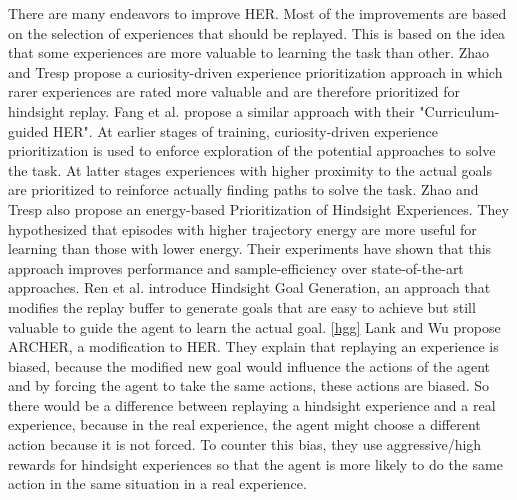\vspace{0.5cm}

There are many endeavors to improve HER. 
Most of the improvements are based on the selection of experiences that should be replayed. This is based on the idea that some experiences are more valuable to learning the task than other.
\newline
Zhao and Tresp propose a curiosity-driven experience prioritization approach in which rarer experiences are rated more valuable and are therefore prioritized for hindsight replay. \cite{curiousher}
\newline
Fang et al. propose a similar approach with their "Curriculum-guided HER". At earlier stages of training, curiosity-driven experience prioritization is used to enforce exploration of the potential approaches to solve the task. At latter stages experiences with higher proximity to the actual goals are prioritized to reinforce actually finding paths to solve the task. \cite{curricher}
\newline
Zhao and Tresp also propose an energy-based Prioritization of Hindsight Experiences. They hypothesized that episodes with higher trajectory energy are more useful for learning than those with lower energy. Their experiments have shown that this approach improves performance and sample-efficiency over state-of-the-art approaches. \cite{energyher}
\newline
Ren et al. introduce Hindsight Goal Generation, an approach that modifies the replay buffer to generate goals that are easy to achieve but still valuable to guide the agent to learn the actual goal. \ref{hgg}
\newline
Lank and Wu propose ARCHER, a modification to HER. They explain that replaying an experience is biased, because the modified new goal would influence the actions of the agent and by forcing the agent to take the same actions, these actions are biased. So there would be a difference between replaying a hindsight experience and a real experience, because in the real experience, the agent might choose a different action because it is not forced. To counter this bias, they use aggressive/high rewards for hindsight experiences so that the agent is more likely to do the same action in the same situation in a real experience. \cite{archer}

\vspace{0.5cm}

